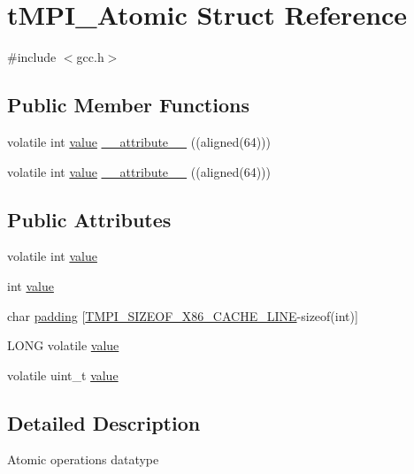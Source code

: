 \hypertarget{structtMPI__Atomic}{\section{t\-M\-P\-I\-\_\-\-Atomic \-Struct \-Reference}
\label{structtMPI__Atomic}
}


{\ttfamily \#include $<$gcc.\-h$>$}

\subsection*{\-Public \-Member \-Functions}
\begin{DoxyCompactItemize}
\item 
volatile int \hyperlink{structtMPI__Atomic_a251089827c7a504b91e5a0f390c2c5e6}{value} \hyperlink{structtMPI__Atomic_a74e263d7499907bc4a25b84af60c63cc}{\-\_\-\-\_\-attribute\-\_\-\-\_\-} ((aligned(64)))
\item 
volatile int \hyperlink{structtMPI__Atomic_a251089827c7a504b91e5a0f390c2c5e6}{value} \hyperlink{structtMPI__Atomic_a74e263d7499907bc4a25b84af60c63cc}{\-\_\-\-\_\-attribute\-\_\-\-\_\-} ((aligned(64)))
\end{DoxyCompactItemize}
\subsection*{\-Public \-Attributes}
\begin{DoxyCompactItemize}
\item 
volatile int \hyperlink{structtMPI__Atomic_a251089827c7a504b91e5a0f390c2c5e6}{value}
\item 
int \hyperlink{structtMPI__Atomic_a251089827c7a504b91e5a0f390c2c5e6}{value}
\item 
char \hyperlink{structtMPI__Atomic_a0bc95c8497ce76b08ed964d06fe5142d}{padding} \mbox{[}\hyperlink{share_2template_2gromacs_2thread__mpi_2atomic_2gcc__x86_8h_aecf8996b3f8284831e7b2b0dca7e681d}{\-T\-M\-P\-I\-\_\-\-S\-I\-Z\-E\-O\-F\-\_\-\-X86\-\_\-\-C\-A\-C\-H\-E\-\_\-\-L\-I\-N\-E}-\/sizeof(int)\mbox{]}
\item 
\-L\-O\-N\-G volatile \hyperlink{structtMPI__Atomic_a0d0d30f68431ff5be90b7913cca5c662}{value}
\item 
volatile uint\-\_\-t \hyperlink{structtMPI__Atomic_a98e7b83d2063a810b3fa8eb7c848e915}{value}
\end{DoxyCompactItemize}


\subsection{\-Detailed \-Description}
\-Atomic operations datatype


